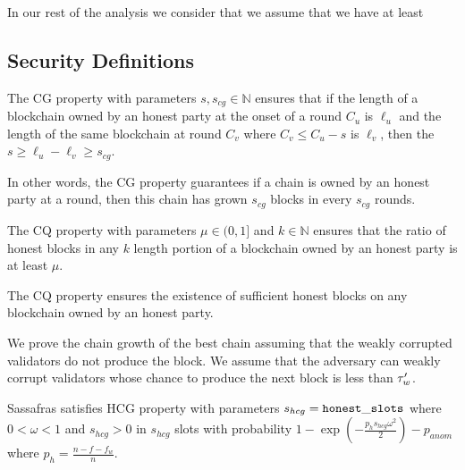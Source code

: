 

In our rest of the analysis we consider that we assume that we have at least $  $

\subsection{Security Definitions}

\begin{definition} \label{def:cg}
	The CG  property with parameters $ s, s_{cg}\in \mathbb{N} $ ensures that if the length of a blockchain owned by an honest party at the onset of a round $ C_u $ is $ \ell_u $ and the length of the same blockchain at round $ C_v  $ where $ C_v \leq C_u - s  $ is $\ell_v$, then the $ s \geq \ell_u  - \ell_v \geq  s_{cg} $.
	
	
\end{definition}

In other words, the CG property guarantees if a chain is owned by an honest party at a round, then this chain has grown $ s_{cg}$ blocks in every $ s_{cg} $ rounds. 

\begin{definition}\label{def:cq}
	The CQ property with parameters $ \mu \in (0,1]  $ and $ k \in \mathbb{N} $ ensures that the ratio of honest blocks in any $ k $ length portion of a blockchain owned by an honest party is at least $ \mu $.
\end{definition} 

The CQ property ensures the existence of sufficient honest blocks on  any blockchain owned by an honest party.

We prove the chain growth of the best chain assuming that the weakly corrupted validators do not produce the block. We assume that the adversary can weakly corrupt validators whose chance to produce the next block is less than $ \tau_w' $.



\begin{theorem}
	Sassafras satisfies HCG property with parameters $s_{hcg} = \mathtt{honest\_slots} $ where $0 < \omega < 1$ and $s_{hcg} > 0$ in $s_{hcg}$ slots  with probability $1-\exp(-\frac{ p_h s_{hcg} \omega^2}{2}) - p_{anom}$ where $ p_h = \frac{n - f - f_w}{n} $.
\end{theorem}

